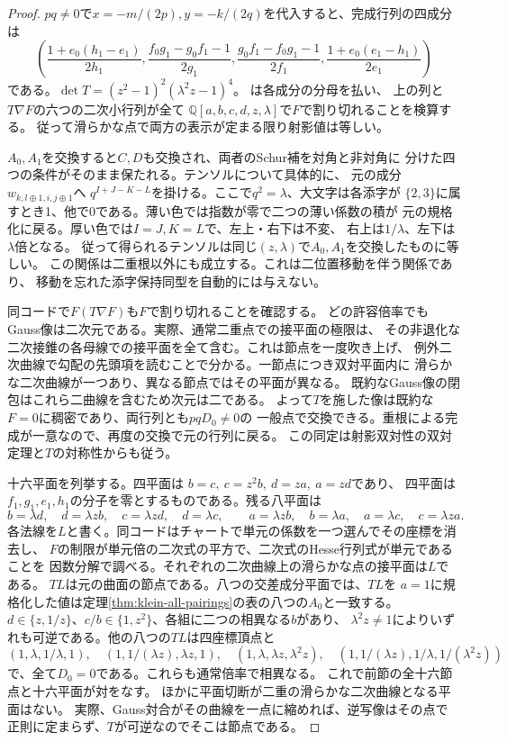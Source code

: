 \begin{proof}
$pq\ne0$で$x=-m/(2p),y=-k/(2q)$を代入すると、完成行列の四成分は
\[
 \left(\frac{1+e_0(h_1-e_1)}{2h_1}, \frac{f_0g_1-g_0f_1-1}{2g_1}, \frac{g_0f_1-f_0g_1-1}{2f_1}, \frac{1+e_0(e_1-h_1)}{2e_1}\right)
\]
である。$\det T=(z^2-1)^2(\lambda^2z-1)^4$。
は各成分の分母を払い、
上の列と$T\nabla F$の六つの二次小行列が全て
$\mathbb Q[a,b,c,d,z,\lambda]$で$F$で割り切れることを検算する。
従って滑らかな点で両方の表示が定まる限り射影値は等しい。

$A_0,A_1$を交換すると$C,D$も交換され、両者のSchur補を対角と非対角に
分けた四つの条件がそのまま保たれる。テンソルについて具体的に、
元の成分$w_{k,l\mathbin\oplus1,i,j\mathbin\oplus1}$へ
$q^{I+J-K-L}$を掛ける。ここで$q^2=\lambda$、大文字は各添字が
$\{2,3\}$に属すとき1、他で0である。薄い色では指数が零で二つの薄い係数の積が
元の規格化に戻る。厚い色では$I=J,K=L$で、左上・右下は不変、
右上は$1/\lambda$、左下は$\lambda$倍となる。
従って得られるテンソルは同じ$(z,\lambda)$で$A_0,A_1$を交換したものに等しい。
この関係は二重根以外にも成立する。これは二位置移動を伴う関係であり、
移動を忘れた添字保持同型を自動的には与えない。

同コードで$F(T\nabla F)$も$F$で割り切れることを確認する。
どの許容倍率でもGauss像は二次元である。実際、通常二重点での接平面の極限は、
その非退化な二次接錐の各母線での接平面を全て含む。これは節点を一度吹き上げ、
例外二次曲線で勾配の先頭項を読むことで分かる。一節点につき双対平面内に
滑らかな二次曲線が一つあり、異なる節点ではその平面が異なる。
既約なGauss像の閉包はこれら二曲線を含むため次元は二である。
よって$T$を施した像は既約な$F=0$に稠密であり、両行列とも$pqD_0\ne0$の
一般点で交換できる。重根による完成が一意なので、再度の交換で元の行列に戻る。
この同定は射影双対性の双対定理と$T$の対称性からも従う。

十六平面を列挙する。四平面は
$b=c,\ c=z^2 b,\ d=za,\ a=zd$であり、
四平面は$f_1,g_1,e_1,h_1$の分子を零とするものである。残る八平面は
\[
 b=\lambda d,\quad d=\lambda z b,\quad c=\lambda z d,\quad d=\lambda c,
 \qquad
 a=\lambda z b,\quad b=\lambda a,\quad a=\lambda c,\quad c=\lambda z a .
\]
各法線を$L$と書く。同コードはチャートで単元の係数を一つ選んでその座標を消去し、
$F$の制限が単元倍の二次式の平方で、二次式のHesse行列式が単元であることを
因数分解で調べる。それぞれの二次曲線上の滑らかな点の接平面は$L$である。
$TL$は元の曲面の節点である。八つの交差成分平面では、$TL$を
$a=1$に規格化した値は定理\ref{thm:klein-all-pairings}の表の八つの$A_0$と一致する。
$d\in\{z,1/z\}$、$c/b\in\{1,z^2\}$、各組に二つの相異なる$b$があり、
$\lambda^2z\ne1$によりいずれも可逆である。他の八つの$TL$は四座標頂点と
\[
 (1,\lambda,1/\lambda,1),\quad(1,1/(\lambda z),\lambda z,1),\quad
 (1,\lambda,\lambda z,\lambda^2z),\quad
 (1,1/(\lambda z),1/\lambda,1/(\lambda^2z))
\]
で、全て$D_0=0$である。これらも通常倍率で相異なる。
これで前節の全十六節点と十六平面が対をなす。
ほかに平面切断が二重の滑らかな二次曲線となる平面はない。
実際、Gauss対合がその曲線を一点に縮めれば、逆写像はその点で
正則に定まらず、$T$が可逆なのでそこは節点である。


\end{proof}
